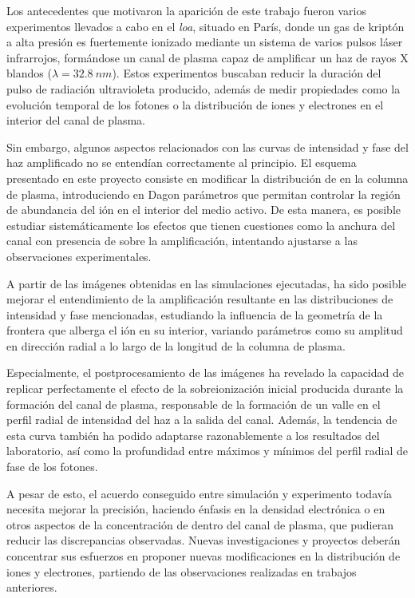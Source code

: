 Los antecedentes que motivaron la aparición de este trabajo fueron varios experimentos\autocite{Tuitje2020,Depresseux2015} llevados a cabo en el \emph{\acrfull{loa}}, situado en París, donde un gas de kriptón a alta presión es fuertemente ionizado mediante un sistema de varios pulsos láser infrarrojos, formándose un canal de plasma capaz de amplificar un haz de rayos X blandos ($\lambda=\qty{32.8}{nm}$). Estos experimentos buscaban reducir la duración del pulso de radiación ultravioleta producido, además de medir propiedades como la evolución temporal de los fotones o la distribución de iones y electrones en el interior del canal de plasma. 

Sin embargo, algunos aspectos relacionados con las curvas de intensidad y fase del haz amplificado no se entendían correctamente al principio. El esquema presentado en este proyecto consiste en modificar la distribución de  en la columna de plasma, introduciendo en Dagon parámetros que permitan controlar la región de abundancia del ión en el interior del medio activo. De esta manera, es posible estudiar sistemáticamente los efectos que tienen cuestiones como la anchura del canal con presencia de  sobre la amplificación, intentando ajustarse a las observaciones experimentales.

A partir de las imágenes obtenidas en las simulaciones ejecutadas, ha sido posible mejorar el entendimiento de la amplificación resultante en las distribuciones de intensidad y fase mencionadas, estudiando la influencia de la geometría de la frontera que alberga el ión  en su interior, variando parámetros como su amplitud en dirección radial a lo largo de la longitud de la columna de plasma.

Especialmente, el postprocesamiento de las imágenes ha revelado la capacidad de replicar perfectamente el efecto de la sobreionización inicial producida durante la formación del canal de plasma, responsable de la formación de un valle en el perfil radial de intensidad del haz a la salida del canal. Además, la tendencia de esta curva también ha podido adaptarse razonablemente a los resultados del laboratorio, así como la profundidad entre máximos y mínimos del perfil radial de fase de los fotones.

A pesar de esto, el acuerdo conseguido entre simulación y experimento todavía necesita mejorar la precisión, haciendo énfasis en la densidad electrónica o en otros aspectos de la concentración de  dentro del canal de plasma, que pudieran reducir las discrepancias observadas. Nuevas investigaciones y proyectos deberán concentrar sus esfuerzos en proponer nuevas modificaciones en la distribución de iones y electrones, partiendo de las observaciones realizadas en trabajos anteriores.

